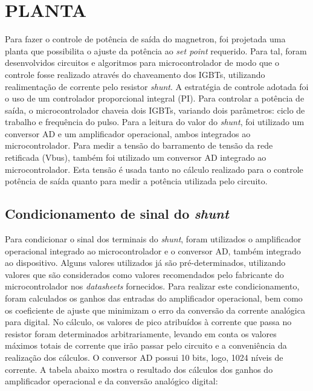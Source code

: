 \section{PLANTA}
Para fazer o controle de potência de saída do magnetron, foi projetada uma planta que possibilita o ajuste da potência ao \textit{set point} requerido. Para tal, foram desenvolvidos circuitos e algoritmos para microcontrolador de modo que o controle fosse realizado através do chaveamento dos IGBTs, utilizando realimentação de corrente pelo resistor \textit{shunt}. A estratégia de controle adotada foi o uso de um controlador proporcional integral (PI). Para controlar a potência de saída, o microcontrolador chaveia dois IGBTs, variando dois parâmetros: ciclo de trabalho e frequência do pulso. Para a leitura do valor do \textit{shunt}, foi utilizado um conversor AD e um amplificador operacional, ambos integrados ao microcontrolador. Para medir a tensão do barramento de tensão da rede retificada (Vbus), também foi utilizado um conversor AD integrado ao microcontrolador. Esta tensão é usada tanto no cálculo realizado para o controle potência de saída quanto para medir a potência utilizada pelo circuito.

\subsection{Condicionamento de sinal do \textit{shunt}}
Para condicionar o sinal dos terminais do \textit{shunt}, foram utilizados o amplificador operacional integrado ao microcontrolador e o conversor AD, também integrado ao dispositivo. Alguns valores utilizados já são pré-determinados, utilizando valores que são considerados como valores recomendados pelo fabricante do microcontrolador nos \textit{datasheets} fornecidos. Para realizar este condicionamento, foram calculados os ganhos das entradas do amplificador operacional, bem como os coeficiente de ajuste que minimizam o erro da conversão da corrente analógica para digital. No cálculo, os valores de pico atribuídos à corrente que passa no resistor foram determinados arbitrariamente, levando em conta os valores máximos totais de corrente que irão passar pelo circuito e a conveniência da realização dos cálculos. O conversor AD possui 10 bits, logo, 1024 níveis de corrente. A tabela abaixo mostra o resultado dos cálculos dos ganhos do amplificador operacional e da conversão analógico digital:

